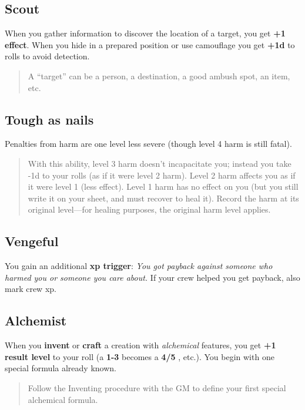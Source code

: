 \documentclass[11pt,oneside]{book}
\newcommand{\gameterm}[1]{\textbf{#1}}
\begin{document}
\subsection{Scout}

When you gather information to discover the location of a target, you get \textbf{+1 effect}. When you hide in a prepared position or use camouflage you get \textbf{+1d} to rolls to avoid detection.

\begin{quote}
	A “target” can be a person, a destination, a good ambush spot, an item, etc.
\end{quote} 

\subsection{Tough as nails}

Penalties from harm are one level less severe (though level 4 harm is still fatal).

\begin{quote}
	With this ability, level 3 harm doesn’t incapacitate you; instead you take -1d to your rolls (as if it were level 2 harm). Level 2 harm affects you as if it were level 1 (less effect). Level 1 harm has no effect on you (but you still write it on your sheet, and must recover to heal it). Record the harm at its original level---for healing purposes, the original harm level applies.
\end{quote} 

\subsection{Vengeful}

You gain an additional \textbf{xp trigger}: \emph{You got payback against someone who harmed you or someone you care about.} If your crew helped you get payback, also mark crew xp.

\subsection{Alchemist}

When you \textbf{invent} or \textbf{craft} a creation with \emph{alchemical} features, you get \textbf{+1 result level} to your roll (a \gameterm{1-3}  becomes a \gameterm{4/5} , etc.). You begin with one special formula already known.

\begin{quote}
	Follow the Inventing procedure with the GM to define your first special alchemical formula.
\end{quote} 
\end{document}

